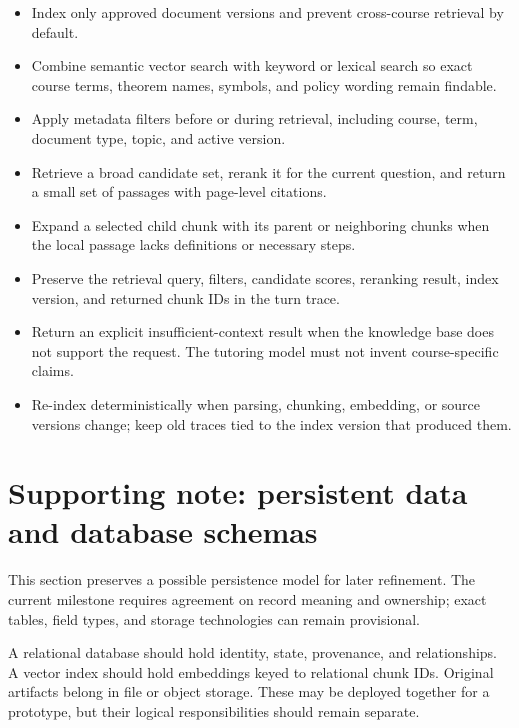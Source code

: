 \documentclass[11pt]{article}
\begin{document}
\begin{itemize}
    \item Index only approved document versions and prevent cross-course retrieval by default.
    \item Combine semantic vector search with keyword or lexical search so exact course terms, theorem names, symbols, and policy wording remain findable.
    \item Apply metadata filters before or during retrieval, including course, term, document type, topic, and active version.
    \item Retrieve a broad candidate set, rerank it for the current question, and return a small set of passages with page-level citations.
    \item Expand a selected child chunk with its parent or neighboring chunks when the local passage lacks definitions or necessary steps.
    \item Preserve the retrieval query, filters, candidate scores, reranking result, index version, and returned chunk IDs in the turn trace.
    \item Return an explicit insufficient-context result when the knowledge base does not support the request. The tutoring model must not invent course-specific claims.
    \item Re-index deterministically when parsing, chunking, embedding, or source versions change; keep old traces tied to the index version that produced them.
\end{itemize}

\section{Supporting note: persistent data and database schemas}

This section preserves a possible persistence model for later refinement. The current milestone requires agreement on record meaning and ownership; exact tables, field types, and storage technologies can remain provisional.

A relational database should hold identity, state, provenance, and relationships. A vector index should hold embeddings keyed to relational chunk IDs. Original artifacts belong in file or object storage. These may be deployed together for a prototype, but their logical responsibilities should remain separate.
\end{document}
